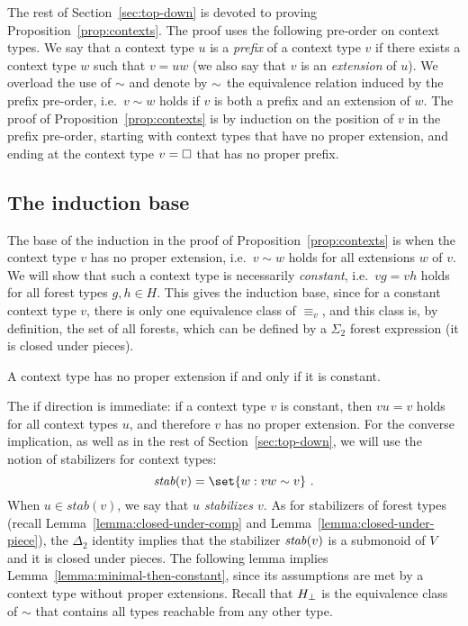 \documentclass{LMCS}
\begin{document}
The rest  of Section~\ref{sec:top-down} is devoted to proving Proposition~\ref{prop:contexts}.
The proof uses the following pre-order on context types. We say that a
context type $u$ is a \emph{prefix} of a context type $v$ if there exists a context type $w$
such that $v=uw$ (we also say that $v$ is an \emph{extension} of
$u$). We overload the use of
$\sim$ and denote by $\sim$ the equivalence relation induced by
the prefix pre-order, i.e.~$v \sim w$ holds if $v$ is both a prefix
and an extension of $w$.
The proof of Proposition~\ref{prop:contexts} is by induction on the
position of 
$v$ in the prefix pre-order,  starting with context types that have no
proper extension, and ending at the context type  $v=\Box$ that has no
proper prefix.

\subsection{ The induction base}
The base of the induction in the proof of Proposition~\ref{prop:contexts} is
when the context type $v$ has no proper extension, i.e.~$v \sim w$ holds for
all extensions $w$ of $v$. We will show that such a context type is necessarily
\emph{constant}, i.e.~$vg=vh$ holds for all forest types $g,h \in H$.  This
gives the induction base, since for a constant context type $v$, there is only one
equivalence class of $\equiv_v$, and this class is, by definition, the set of all
forests, which can be defined by a $\Sigma_2$ forest expression (it is closed under pieces).

\begin{lem}\label{lemma:minimal-then-constant}
  A context type has no proper extension if and only if it is constant.
\end{lem}

The if direction is immediate: if a context type $v$ is constant, then
$vu=v$ holds for all context types $u$, and therefore $v$ has no
proper extension. For the converse implication, as well as in the rest
of Section~\ref{sec:top-down}, we will use the notion of stabilizers
for context types:
\[
  \stab(v)  =  \set{w : vw \ordereq v}\ .
\]
When $u \in stab(v)$, we say that \emph{$u$ stabilizes $v$}.  As for
stabilizers of forest types (recall Lemma~\ref{lemma:closed-under-comp} and
Lemma~\ref{lemma:closed-under-piece}), the $\Delta_2$ identity implies that the
stabilizer $\mathit{stab}(v)$ is a submonoid of $V$ and it is closed under pieces.  The
following lemma implies Lemma~\ref{lemma:minimal-then-constant}, since its
assumptions are met by a context type without proper extensions.
Recall that
${H_\bot}$ is the equivalence class of $\sim$ that contains all types reachable
from any other type.
\end{document}
